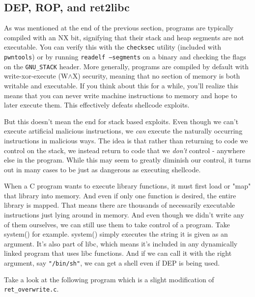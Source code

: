 \subsection{DEP, ROP, and ret2libc}
As was mentioned at the end of the previous section, programs are typically
compiled with an NX bit, signifying that their stack and heap segments are not
executable. You can verify this with the \texttt{checksec} utility (included
with \texttt{pwntools}) or by running \texttt{readelf --segments} on a
binary and checking the flags on the \texttt{GNU\_STACK} header. More generally,
programs are compiled by default with write-xor-execute (W$\wedge$X) security,
meaning that no section of memory is both writable and executable. If you think
about this for a while, you'll realize this means that you can never write
machine instructions to memory and hope to later execute them. This effectively
defeats shellcode exploits.

But this doesn't mean the end for stack based exploits. Even though we can't
execute artificial malicious instructions, we \emph{can} execute the naturally
occurring instructions in malicious ways. The idea is that rather than returning
to code we control on the stack, we instead return to code that we \emph{don't}
control - anywhere else in the program. While this may seem to greatly diminish
our control, it turns out in many cases to be just as dangerous as executing
shellcode.

When a C program wants to execute library functions, it must first load or
"map" that library into memory. And even if only one function is desired, the
entire library is mapped. That means there are thousands of necessarily
executable instructions just lying around in memory. And even though we didn't
write any of them ourselves, we can still use them to take control of a
program. Take system() for example. system() simply executes the string it is
given as an argument. It's also part of libc, which means it's included in any
dynamically linked program that uses libc functions. And if we can call it with
the right argument, say \texttt{"/bin/sh"}, we can get a shell even if DEP is
being used.

Take a look at the following program which is a slight modification of
\texttt{ret\_overwrite.c}.

